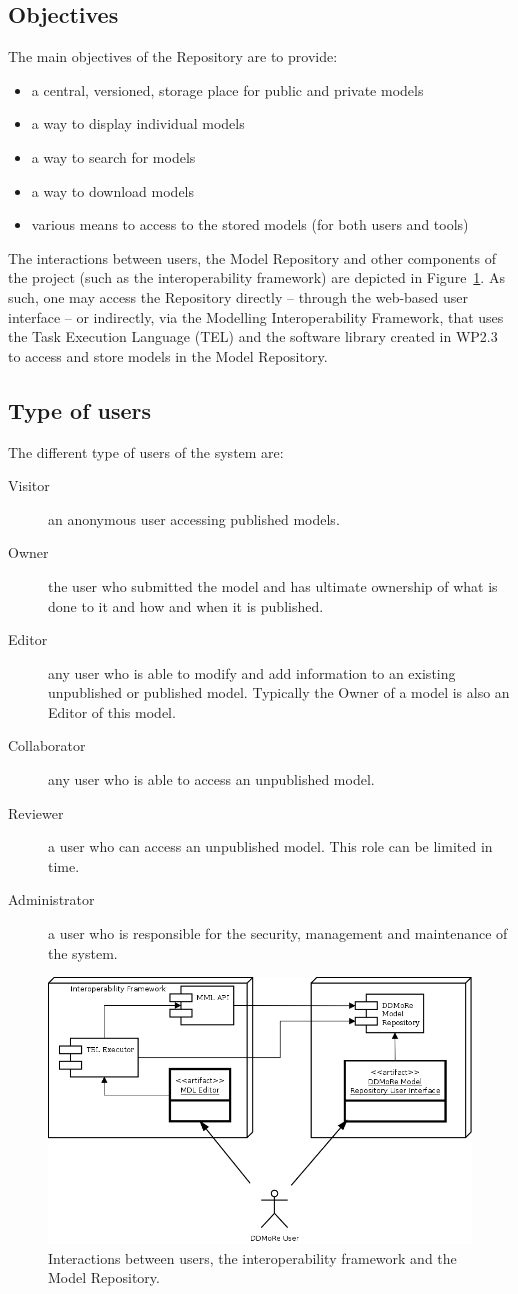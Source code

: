 \subsection{Objectives}
\label{objectives}
The main objectives of the Repository are to provide:
\begin{itemize}
  \item a central, versioned, storage place for public and private models
  \item a way to display individual models
  \item a way to search for models
  \item a way to download models
  \item various means to access to the stored models (for both users and tools)
\end{itemize}

The interactions between users, the Model Repository and other components of the project (such as the interoperability framework) are depicted in Figure~\ref{fig:userInteraction}. As such, one may access the Repository directly -- through the web-based user interface -- or indirectly, via the Modelling Interoperability Framework, that uses the Task Execution Language (TEL) and the software library created in WP2.3 to access and store models in the \ddmore Model Repository.


\subsection{Type of users}
\label{users}
The different type of users of the system are:
\begin{description}
  \item[Visitor] an anonymous user accessing published models.
  \item[Owner] the user who submitted the model and has ultimate ownership of what is done to it and how and
when it is published.
  \item[Editor] any user who is able to modify and add information to an existing unpublished or published model. Typically the Owner of a model is
also an Editor of this model.
  \item[Collaborator] any user who is able to access an unpublished model.
  \item[Reviewer] a user who can access an unpublished model. This role can be limited in time.
  \item[Administrator] a user who is responsible for the security, management and maintenance of the system.
\end{description}


\begin{figure}[h!]
\centering
\includegraphics[width=0.75\linewidth]{img/UserInteraction}
\caption{Interactions between users, the interoperability framework and the Model Repository.}
\label{fig:userInteraction}
\end{figure}


